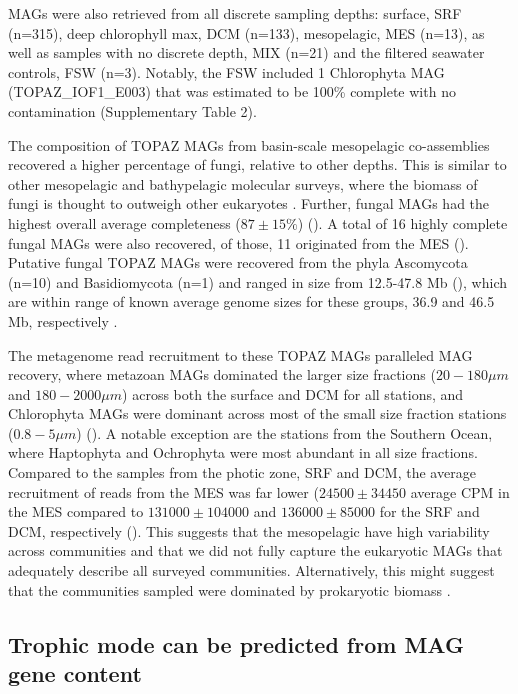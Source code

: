 \documentclass[12pt]{article}
\numberwithin{equation}{section}
\begin{document}
MAGs were also retrieved from all discrete sampling depths: surface, SRF (n=315), deep chlorophyll max, DCM (n=133), mesopelagic, MES (n=13), as well as samples with no discrete depth, MIX (n=21) and the filtered seawater controls, FSW (n=3). Notably, the FSW included 1 Chlorophyta MAG (TOPAZ\_IOF1\_E003) that was estimated to be 100\% complete with no contamination (Supplementary Table 2). 

The composition of TOPAZ MAGs from basin-scale mesopelagic co-assemblies recovered a higher percentage of fungi, relative to other depths. This is similar to other mesopelagic and bathypelagic molecular surveys, where the biomass of fungi is thought to outweigh other eukaryotes \citep{Morales_2019,Pernice_2015,Edgcomb_2010}. Further, fungal MAGs had the highest overall average completeness ($87 \pm 15\%$) (). A total of 16 highly complete fungal MAGs were also recovered, of those, 11 originated from the MES (). Putative fungal TOPAZ MAGs were recovered from the phyla Ascomycota (n=10) and Basidiomycota (n=1) and ranged in size from 12.5-47.8 Mb (), which are within range of known average genome sizes for these groups, 36.9 and 46.5 Mb, respectively \citep{Mohanta_2015}. 

The metagenome read recruitment to these TOPAZ MAGs paralleled MAG recovery, where metazoan MAGs dominated the larger size fractions ($20-180 \mu m$ and $180-2000 \mu m$) across both the surface and DCM for all stations, and Chlorophyta MAGs were dominant across most of the small size fraction stations ($0.8-5 \mu m$) (). A notable exception are the stations from the Southern Ocean, where Haptophyta and Ochrophyta were most abundant in all size fractions. Compared to the samples from the photic zone, SRF and DCM, the average recruitment of reads from the MES was far lower ($24500 \pm 34450$ average CPM in the MES compared to $131000 \pm 104000 $ and $136000 \pm 85000$ for the SRF and DCM, respectively (). This suggests that the mesopelagic have high variability across communities \citep{Pernice_2015} and that we did not fully capture the eukaryotic MAGs that adequately describe all surveyed communities. Alternatively, this might suggest that the communities sampled were dominated by prokaryotic biomass \citep{Pernice_2014}.  


\subsection*{Trophic mode can be predicted from MAG gene content}
\end{document}
